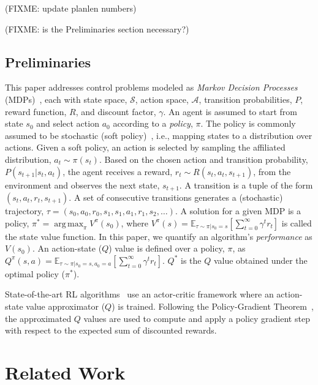 \documentclass{article}
\DeclareMathOperator*{\argmax}{arg\,max}
\begin{document}
        (FIXME: update planlen numbers)
        
        (FIXME: is the Preliminaries section necessary?)

        \subsection{Preliminaries}
            This paper addresses control problems modeled as \textit{Markov Decision Processes} (MDPs)~\cite{puterman2014markov}, each with state space, $\mathcal{S}$, action space, $\mathcal{A}$, transition probabilities, $P$, reward function, $R$, and discount factor, $\gamma$. 
            An agent is assumed to start from state $s_0$ and select action $a_0$ according to a \textit{policy}, $\pi$. The policy is commonly assumed to be stochastic (soft policy)~\cite{haarnoja2018soft}, i.e., mapping states to a distribution over actions.
            Given a soft policy, an action is selected by sampling the affiliated distribution, $a_t \sim \pi(s_t)$. Based on the chosen action and transition probability, $P(s_{t+1} | s_t, a_t)$, the agent receives a reward, $r_t \sim R(s_t, a_t, s_{t+1})$, from the environment and observes the next state, $s_{t+1}$. A transition is a tuple of the form $(s_t,a_t,r_t,s_{t+1})$. A set of consecutive transitions generates a (stochastic) trajectory, $\tau = (s_0, a_0, r_0, s_1, s_1, a_1, r_1, s_2,\ldots)$. A solution for a given MDP is a policy, $\pi^* = \argmax_{\pi} V^{\pi}(s_0)$, where $V^{\pi}(s)=\mathbb{E}_{\tau \sim \pi| s_0=s}[\sum_{t=0}^{\infty}\gamma^t r_t]$ is called the state value function. In this paper, we quantify an algorithm's \textit{performance} as $V(s_0)$. An action-state ($Q$) value is defined over a policy, $\pi$, as $Q^\pi(s,a)=\mathbb{E}_{\tau \sim \pi | s_0=s, a_0=a}[\sum_{t=0}^{\infty}\gamma^t r_t]$. $Q^*$ is the $Q$ value obtained under the optimal policy ($\pi^*$). %

            State-of-the-art RL algorithms~\cite{haarnoja2018soft} use an actor-critic framework where an action-state value approximator ($Q$) is trained. Following the Policy-Gradient Theorem~\cite{reinforce}, the approximated $Q$ values are used to compute and apply a policy gradient step with respect to the expected sum of discounted rewards.

    \section{Related Work}
\end{document}
